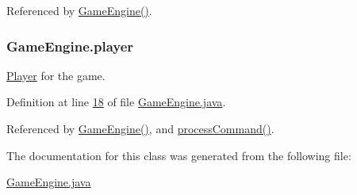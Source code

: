 Referenced by \hyperlink{GameEngine_8java_source_l00047}{Game\-Engine()}.

\hypertarget{classGameEngine_a4666c6719428cc43014b30b305eeef5d}{
\subsubsection[{player}]{ Game\-Engine.\-player\hspace{0.3cm}{\ttfamily [private]}}}\label{classGameEngine_a4666c6719428cc43014b30b305eeef5d}


\hyperlink{classPlayer}{Player} for the game. 



Definition at line \hyperlink{GameEngine_8java_source_l00018}{18} of file \hyperlink{GameEngine_8java_source}{Game\-Engine.\-java}.



Referenced by \hyperlink{GameEngine_8java_source_l00047}{Game\-Engine()}, and \hyperlink{GameEngine_8java_source_l00167}{process\-Command()}.



The documentation for this class was generated from the following file\-:\begin{DoxyCompactItemize}
\item 
\hyperlink{GameEngine_8java}{Game\-Engine.\-java}\end{DoxyCompactItemize}
